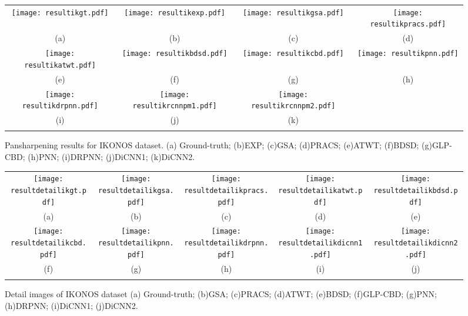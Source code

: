 \documentclass[journal]{IEEEtran}
\begin{document}
\begin{figure*}[t]\scriptsize
\centering
  \begin{tabular}{cccc}
\texttt{[image: resultikgt.pdf]} &
\texttt{[image: resultikexp.pdf]} &
\texttt{[image: resultikgsa.pdf]} &
\texttt{[image: resultikpracs.pdf]} \\
(a) & (b) & (c)  & (d)  \\

\texttt{[image: resultikatwt.pdf]} &
\texttt{[image: resultikbdsd.pdf]} &
\texttt{[image: resultikcbd.pdf]} &
\texttt{[image: resultikpnn.pdf]} \\
(e) &(f) &(g) & (h) \\

\texttt{[image: resultikdrpnn.pdf]} &
\texttt{[image: resultikrcnnpm1.pdf]} &
\texttt{[image: resultikrcnnpm2.pdf]} \\
(i) &(j) &(k)  \\
\\
\end{tabular}
\caption{Pansharpening results for IKONOS dataset. (a) Ground-truth; (b)EXP; (c)GSA; (d)PRACS; (e)ATWT; (f)BDSD;  (g)GLP-CBD; (h)PNN; (i)DRPNN; (j)DiCNN1; (k)DiCNN2. }
\label{figure:map:ik}
\end{figure*}

\begin{figure*}[t]\scriptsize
\centering
\begin{tabular}{ccccc}
\texttt{[image: resultdetailikgt.pdf]} &
\texttt{[image: resultdetailikgsa.pdf]} &
\texttt{[image: resultdetailikpracs.pdf]} &
\texttt{[image: resultdetailikatwt.pdf]} &
\texttt{[image: resultdetailikbdsd.pdf]} \\
(a) & (b) & (c) &(d) &(e) \\
\texttt{[image: resultdetailikcbd.pdf]} &
\texttt{[image: resultdetailikpnn.pdf]} &
\texttt{[image: resultdetailikdrpnn.pdf]} &
\texttt{[image: resultdetailikdicnn1.pdf]} &
\texttt{[image: resultdetailikdicnn2.pdf]} \\
(f) & (g) & (h) &(i) &(j)  \\
\\
\end{tabular}
\caption{Detail images of IKONOS dataset (a) Ground-truth;  (b)GSA; (c)PRACS; (d)ATWT; (e)BDSD; (f)GLP-CBD; (g)PNN; (h)DRPNN; (i)DiCNN1; (j)DiCNN2.}
\label{figure:detailimage:ik}
\end{figure*}
\end{document}
